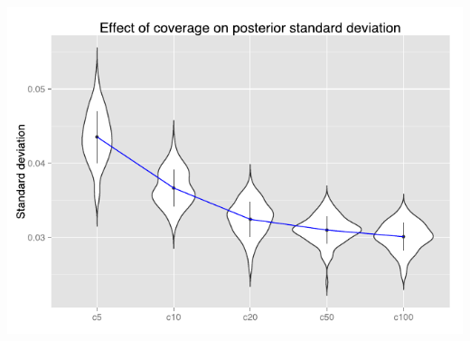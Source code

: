 \documentclass[t,presentation,10pt]{beamer}
\begin{document}
\begin{frame}[c]{}
	\begin{center}
		\includegraphics[width=\textwidth]{fig/figure4-coverage-sd}
	\end{center}
\end{frame}
\end{document}
